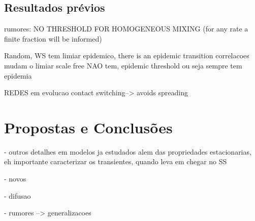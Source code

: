 \documentclass[a4paper,11pt]{report}
\begin{document}
\section{Resultados pr\'evios}


rumores: NO THRESHOLD FOR HOMOGENEOUS MIXING (for any rate a finite fraction will 
be informed)\cite{Castellano:2009ce}

Random, WS tem limiar epidemico, there is an epidemic transition \cite{Zanette:2001kh} 
correlacoes mudam o limiar
scale free NAO tem, epidemic threshold ou seja sempre tem epidemia

REDES em evolucao 
contact switching--> avoids spreading \cite{RisauGusman:2009jh}

\chapter{Propostas e Conclus\~oes}
\label{chap:conc}

- outros detalhes em modelos ja estudados
alem das propriedades estacionarias, eh importante caracterizar 
os transientes, quando leva em chegar no SS 

- novos

- difusao

- rumores --> generalizacoes


\clearpage
{}
{}







\phantom{x}



\end{document}
